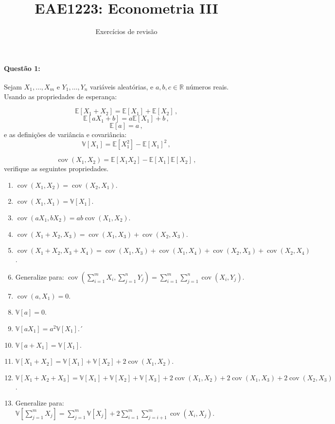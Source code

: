 \documentclass[10pt,a4paper]{article}
\title{\large EAE1223: Econometria III}
\author{\normalsize Exercícios de revisão}
\date{}
\begin{document}
	\maketitle
	\paragraph{Questão 1:} Sejam $X_1,\ldots,X_m$ e $Y_1,\ldots, Y_n$ variáveis aleatórias, e $a,b,c \in \mathbb{R}$ números reais. Usando as propriedades de esperança:
	
	$$\mathbb{E}[X_1 + X_2] = \mathbb{E}[X_1] + \mathbb{E}[X_2] \, ,$$
	$$\mathbb{E}[aX_1 + b] = a\mathbb{E}[X_1] + b \, ,$$
	$$\mathbb{E}[a] = a \, ,$$
	e as definições de variância e covariância:
		$$\mathbb{V}[X_1] = \mathbb{E}[X_1^2] - \mathbb{E}[X_1]^2\,,$$

$$\operatorname{cov}(X_1,X_2) = \mathbb{E}[X_1X_2] - \mathbb{E}[X_1]\mathbb{E}[X_2]\,,$$
verifique as seguintes propriedades.

\begin{enumerate}
	\item $\operatorname{cov}(X_1,X_2) = \operatorname{cov}(X_2,X_1)$.
	\item $\operatorname{cov}(X_1,X_1) =  \mathbb{V}[X_1]$.
	\item $\operatorname{cov}(aX_1,bX_2) =  ab\operatorname{cov}(X_1,X_2)$.
	\item $\operatorname{cov}(X_1 + X_2,X_3) =  \operatorname{cov}(X_1,X_3) + \operatorname{cov}(X_2,X_3)$.
	\item $\operatorname{cov}(X_1 + X_2,X_3 + X_4) = \operatorname{cov}(X_1,X_3) + \operatorname{cov}(X_1,X_4) + \operatorname{cov}(X_2,X_3) + \operatorname{cov}(X_2,X_4)$.
	\item Generalize para: $\operatorname{cov}(\sum_{i=1}^mX_i,\sum_{j=1}^n Y_j) = \sum_{i=1}^{m}\sum_{j=1}^{n} \operatorname{cov}(X_i,Y_j)$. 
	\item $\operatorname{cov}(a,X_1) = 0$.
	\item $\mathbb{V}[a] = 0$.
	\item $\mathbb{V}[aX_1] = a^2 \mathbb{V}[X_1]$.´
	\item $\mathbb{V}[a + X_1] = \mathbb{V}[X_1]$.
	\item $\mathbb{V}[X_1 + X_2] = \mathbb{V}[X_1] + \mathbb{V}[X_2] + 2 \operatorname{cov}(X_1,X_2)$.
	\item $\mathbb{V}[X_1 + X_2 + X_3] = \mathbb{V}[X_1] + \mathbb{V}[X_2] +  \mathbb{V}[X_3]+ 2 \operatorname{cov}(X_1,X_2) + 2 \operatorname{cov}(X_1,X_3) + 2 \operatorname{cov}(X_2,X_3)$.
	\item Generalize para: $\mathbb{V}[\sum_{j=1}^{m}X_j] = \sum_{j=1}^m \mathbb{V}[X_j] + 2\sum_{i=1}^m \sum_{j=i+1}^m \operatorname{cov}(X_i,X_j)$.

\end{enumerate}
\end{document}
